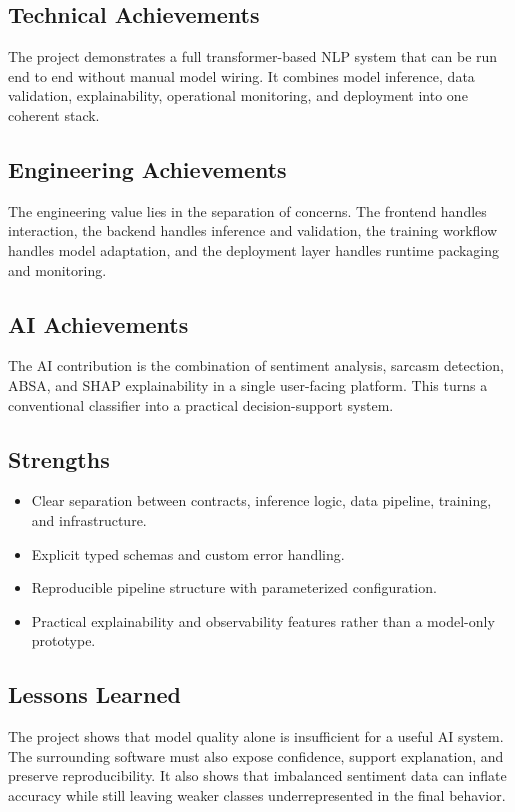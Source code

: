 \documentclass[12pt, a4paper]{article}
\begin{document}
\subsection{Technical Achievements}
The project demonstrates a full transformer-based NLP system that can be run end to end without manual model wiring. It combines model inference, data validation, explainability, operational monitoring, and deployment into one coherent stack.

\subsection{Engineering Achievements}
The engineering value lies in the separation of concerns. The frontend handles interaction, the backend handles inference and validation, the training workflow handles model adaptation, and the deployment layer handles runtime packaging and monitoring.

\subsection{AI Achievements}
The AI contribution is the combination of sentiment analysis, sarcasm detection, ABSA, and SHAP explainability in a single user-facing platform. This turns a conventional classifier into a practical decision-support system.

\subsection{Strengths}
\begin{itemize}[noitemsep]
  \item Clear separation between contracts, inference logic, data pipeline, training, and infrastructure.
  \item Explicit typed schemas and custom error handling.
  \item Reproducible pipeline structure with parameterized configuration.
  \item Practical explainability and observability features rather than a model-only prototype.
\end{itemize}

\subsection{Lessons Learned}
The project shows that model quality alone is insufficient for a useful AI system. The surrounding software must also expose confidence, support explanation, and preserve reproducibility. It also shows that imbalanced sentiment data can inflate accuracy while still leaving weaker classes underrepresented in the final behavior.
\end{document}
